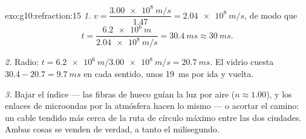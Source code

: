 \begin{solution}{exo:g10:refraction:15}
\emph{1.} $v = \dfrac{\qty{3.00e8}{m/s}}{1.47} = \qty{2.04e8}{m/s}$, de
modo que
\[
t = \frac{\qty{6.2e6}{m}}{\qty{2.04e8}{m/s}} = \qty{30.4}{ms} \approx
\qty{30}{ms}.
\]

\emph{2.} Radio: $t = \qty{6.2e6}{m}/\qty{3.00e8}{m/s} =
\qty{20.7}{ms}$. El vidrio cuesta $30.4 - 20.7 = \qty{9.7}{ms}$ en cada
sentido, unos \qty{19}{ms} por ida y vuelta.

\emph{3.} Bajar el índice --- las fibras de  hueco guían la luz
por aire ($n \approx 1.00$), y los enlaces de microondas por la
atmósfera hacen lo mismo --- o acortar el camino: un cable tendido más
cerca de la ruta de círculo máximo entre las dos ciudades. Ambas cosas
se venden de verdad, a tanto el milisegundo.
\end{solution}

